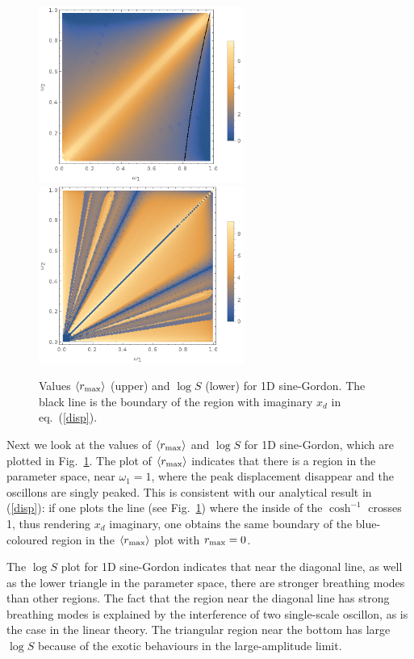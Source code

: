 \documentclass[11pt]{book}
\begin{document}
\begin{figure}
  \centering
  \includegraphics[width=0.6\textwidth]{plot/r_max-sine-1d.png}\\\vskip20pt
  \includegraphics[width=0.6\textwidth]{plot/slow-mode-sine-1d.png}
  \caption{Values $\langle r_{\rm max}\rangle$ (upper) and  $\log{S}$ (lower) for 1D sine-Gordon. The black line is the boundary of the region with imaginary $x_d$ in eq.~(\ref{disp}).}\label{sine-1d}
\end{figure}

Next we look at the values of $\langle r_{\rm max}\rangle$ and $\log{S}$ for 1D sine-Gordon, which are plotted in Fig.~\ref{sine-1d}. The plot of $\langle r_{\rm max}\rangle$ indicates that there is a region in the parameter space, near $\omega_1=1$, where the peak displacement disappear and the oscillons are singly peaked. This is consistent with our analytical result in (\ref{disp}): if one plots the line (see Fig.~\ref{sine-1d}) where the inside of the $\cosh^{-1}$ crosses 1, thus rendering $x_d$ imaginary, one obtains the same boundary of the blue-coloured region in the $\langle r_{\rm max}\rangle$ plot with $r_{\rm max}=0$.

The $\log S$ plot for 1D sine-Gordon indicates that near the diagonal line, as well as the lower triangle in the parameter space, there are stronger breathing modes than other regions. The fact that the region near the diagonal line has strong breathing modes is explained by the interference of two single-scale oscillon, as is the case in the linear theory. The triangular region near the bottom has large $\log S$ because of the exotic behaviours in the large-amplitude limit.
\end{document}
